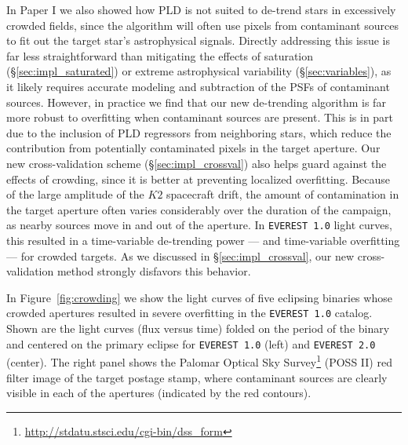 \documentclass[]{emulateapj}
\begin{document}
In Paper I we also showed how PLD is not suited to de-trend stars in excessively crowded fields,
since the algorithm will often use pixels from contaminant sources to fit out the target star's astrophysical
signals. Directly addressing this issue is far less straightforward than mitigating the effects of saturation (\S\ref{sec:impl_saturated})
or extreme astrophysical variability (\S\ref{sec:variables}), as it likely requires accurate modeling and
subtraction of the PSFs of contaminant sources. However, in practice we find that our new de-trending
algorithm is far more robust to overfitting when contaminant sources are present. This is in part
due to the inclusion of PLD regressors from neighboring stars, which reduce the contribution from
potentially contaminated pixels in the target aperture. Our new cross-validation scheme (\S\ref{sec:impl_crossval})
also helps guard against the effects of crowding, since it is better at preventing localized
overfitting. Because of the large amplitude of the $K2$ spacecraft drift, the amount of contamination
in the target aperture often varies considerably over the duration of the campaign, as nearby sources
move in and out of the aperture. In \texttt{EVEREST 1.0} light curves, this resulted in a time-variable
de-trending power --- and time-variable overfitting --- for crowded targets. As we discussed in \S\ref{sec:impl_crossval},
our new cross-validation method strongly disfavors this behavior.

In Figure~\ref{fig:crowding} we show the light curves of five eclipsing binaries whose crowded apertures
resulted in severe overfitting in the \texttt{EVEREST 1.0} catalog. Shown are the light curves (flux versus time) folded
on the period of the binary and centered on the primary eclipse for \texttt{EVEREST 1.0} (left) and \texttt{EVEREST 2.0} (center).
The right panel shows the Palomar Optical Sky Survey\footnote{\url{http://stdatu.stsci.edu/cgi-bin/dss_form}} (POSS II)
red filter image of the target postage stamp, where contaminant sources are clearly visible in each of the apertures (indicated
by the red contours).
\end{document}
